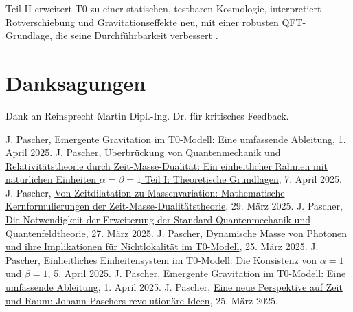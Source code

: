 \documentclass[12pt,a4paper]{article}
\newenvironment{acknowledgments}
{\section*{Danksagungen}}
{\vspace{1em}}
\begin{document}
	Teil II erweitert T0 zu einer statischen, testbaren Kosmologie, interpretiert Rotverschiebung und Gravitationseffekte neu, mit einer robusten QFT-Grundlage, die seine Durchführbarkeit verbessert \cite{pascher_perspective_2025}.
	
	\begin{acknowledgments}
		Dank an Reinsprecht Martin Dipl.-Ing. Dr. für kritisches Feedback.
	\end{acknowledgments}
	
	
	\begin{thebibliography}{99}
		 J. Pascher, \href{https://github.com/jpascher/T0-Time-Mass-Duality/tree/main/2/pdf/Deutsch/EmergentGravT0.pdf}{Emergente Gravitation im T0-Modell: Eine umfassende Ableitung}, 1. April 2025.
		 J. Pascher, \href{https://github.com/jpascher/T0-Time-Mass-Duality/tree/main/2/pdf/Deutsch/QMRelTimeMassPart1.pdf}{Überbrückung von Quantenmechanik und Relativitätstheorie durch Zeit-Masse-Dualität: Ein einheitlicher Rahmen mit natürlichen Einheiten \(\alpha = \beta = 1\) Teil I: Theoretische Grundlagen}, 7. April 2025.
		 J. Pascher, \href{https://github.com/jpascher/T0-Time-Mass-Duality/tree/main/2/pdf/Deutsch/MathZeitMasseLagrange.pdf}{Von Zeitdilatation zu Massenvariation: Mathematische Kernformulierungen der Zeit-Masse-Dualitätstheorie}, 29. März 2025.
		 J. Pascher, \href{https://github.com/jpascher/T0-Time-Mass-Duality/tree/main/2/pdf/Deutsch/NotwendigkeitQMErweiterung.pdf}{Die Notwendigkeit der Erweiterung der Standard-Quantenmechanik und Quantenfeldtheorie}, 27. März 2025.
		 J. Pascher, \href{https://github.com/jpascher/T0-Time-Mass-Duality/tree/main/2/pdf/Deutsch/DynMassePhotonenNichtlokal.pdf}{Dynamische Masse von Photonen und ihre Implikationen für Nichtlokalität im T0-Modell}, 25. März 2025.
		 J. Pascher, \href{https://github.com/jpascher/T0-Time-Mass-Duality/tree/main/2/pdf/Deutsch/Alpha1Beta1Konsistenz.pdf}{Einheitliches Einheitensystem im T0-Modell: Die Konsistenz von \(\alpha = 1\) und \(\beta = 1\)}, 5. April 2025.
		 J. Pascher, \href{https://github.com/jpascher/T0-Time-Mass-Duality/tree/main/2/pdf/Deutsch/EmergentGravT0.pdf}{Emergente Gravitation im T0-Modell: Eine umfassende Ableitung}, 1. April 2025.
		 J. Pascher, \href{https://github.com/jpascher/T0-Time-Mass-Duality/tree/main/2/pdf/Deutsch/ZeitRaumPascher.pdf}{Eine neue Perspektive auf Zeit und Raum: Johann Paschers revolutionäre Ideen}, 25. März 2025.

\end{thebibliography}
\end{document}
